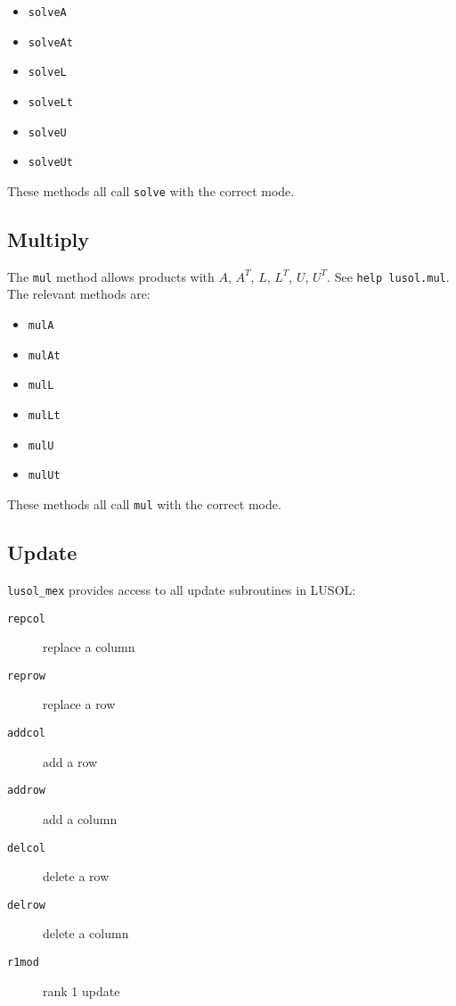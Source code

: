 \documentclass[11pt]{article}
\newcommand{\T}{^T}
\newcommand{\lmex}{\texttt{lusol\_mex}\xspace}
\begin{document}
\begin{itemize}
\item \texttt{solveA}
\item \texttt{solveAt}
\item \texttt{solveL}
\item \texttt{solveLt}
\item \texttt{solveU}
\item \texttt{solveUt}
\end{itemize}

These methods all call \texttt{solve} with the correct mode.

\subsection{Multiply}

The \texttt{mul} method allows products with $A$, $A\T$, $L$, $L\T$,
$U$, $U\T$.  See \texttt{help lusol.mul}.  The relevant methods are:

\begin{itemize}
\item \texttt{mulA}
\item \texttt{mulAt}
\item \texttt{mulL}
\item \texttt{mulLt}
\item \texttt{mulU}
\item \texttt{mulUt}
\end{itemize}

These methods all call \texttt{mul} with the correct mode.

\subsection{Update}

\lmex provides access to all update subroutines in LUSOL:

\begin{description}
\item[\texttt{repcol}] replace a column
\item[\texttt{reprow}] replace a row
\item[\texttt{addcol}] add a row
\item[\texttt{addrow}] add a column
\item[\texttt{delcol}] delete a row
\item[\texttt{delrow}] delete a column
\item[\texttt{r1mod}] rank 1 update
\end{description}
\end{document}
